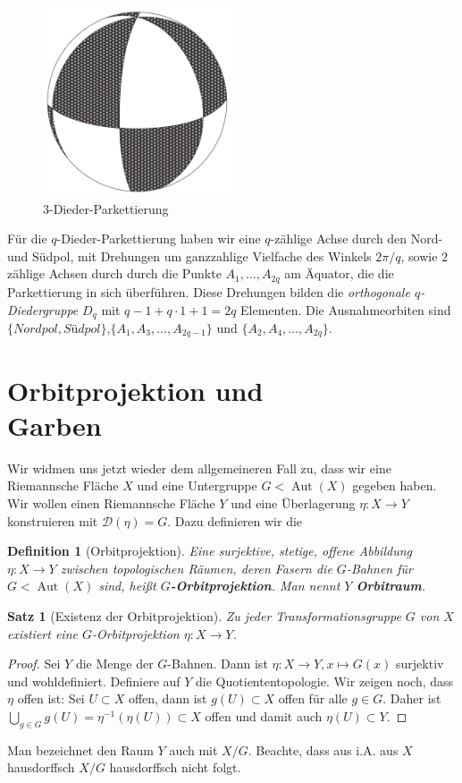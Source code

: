 \documentclass[12pt,a4paper]{article}
\theoremstyle{plain}
\newtheorem{Satz}[Theorem]{Satz}
\newtheorem{Definition}[Theorem]{Definition}
\newcommand{\herv}[1]{{\emph{\textbf{#1}}}}
\numberwithin{equation}{section}
\begin{document}
\begin{figure} \includegraphics[width=0.5\textwidth]{Dieder.png}
\caption{$3$-Dieder-Parkettierung}
\end{figure}\noindent Für die $q$-Dieder-Parkettierung haben wir eine $q$-zählige Achse durch den Nord- und Südpol, mit Drehungen um ganzzahlige Vielfache des Winkels $2\pi/q$, sowie $2$ zählige Achsen durch durch die Punkte $A_1,\ldots,A_{2q}$ am Äquator, die die Parkettierung in sich überführen. Diese Drehungen bilden die \emph{orthogonale $q$-Diedergruppe} $D_q$ mit $q-1+q\cdot 1+1=2q$ Elementen. Die Ausnahmeorbiten sind \linebreak $\{\textit{Nordpol}, \textit{Südpol}\}$,$\{A_1,A_3,\ldots,A_{2q-1}\}$ und \linebreak $\{A_2,A_4,\ldots,A_{2q}\}$.

\section{Orbitprojektion und \\Garben}
Wir widmen uns jetzt wieder dem allgemeineren Fall zu, dass wir eine Riemannsche Fläche $X$ und eine Untergruppe $G < \operatorname{Aut}(X)$ gegeben haben. Wir wollen einen Riemannsche Fläche $Y$ und eine Überlagerung $\eta: X\rightarrow Y$ konstruieren mit $\mathcal{D}(\eta) = G$. Dazu definieren wir die
\begin{Definition}[Orbitprojektion] Eine surjektive, stetige, offene Abbildung $\eta:X\rightarrow Y$ zwischen topologischen Räumen, deren Fasern die $G$-Bahnen für $G < \operatorname{Aut}(X)$ sind, heißt \herv{$G$-Orbitprojektion}. Man nennt $Y$ \herv{Orbitraum}.
\end{Definition}

\begin{Satz}[Existenz der Orbitprojektion] Zu jeder Transformationsgruppe $G$ von $X$ existiert eine $G$-Orbitprojektion $\eta:X\rightarrow Y$.
\end{Satz}
\begin{proof}
Sei $Y$ die Menge der $G$-Bahnen. Dann ist $\eta: X\rightarrow Y, x\mapsto G(x)$ surjektiv und wohldefiniert. Definiere auf $Y$ die Quotiententopologie. Wir zeigen noch, dass $\eta$ offen ist: Sei  $U\subset X$ offen, dann ist $g(U)\subset X$ offen für alle $g\in G$. Daher ist $\bigcup_{g\in G} g(U) = \eta^{-1}(\eta(U))\subset X$ offen und damit auch $\eta(U)\subset Y$.
\end{proof}
Man bezeichnet den Raum $Y$ auch mit $X/G$. Beachte, dass aus i.A. aus $X$ hausdorffsch $X/G$ hausdorffsch nicht folgt.
\end{document}
